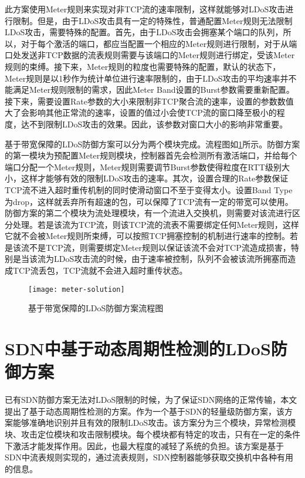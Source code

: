 此方案使用Meter规则来实现对非TCP流的速率限制，这样就能够对LDoS攻击进行限制。但是，由于LDoS攻击具有一定的特殊性，普通配置Meter规则无法限制LDoS攻击，需要特殊的配置。首先，由于LDoS攻击会拥塞某个端口的队列，所以，对于每个激活的端口，都应当配置一个相应的Meter规则进行限制，对于从端口处发送非TCP数据的流表规则需要与该端口的Meter规则进行绑定，受该Meter规则的束缚。接下来，Meter规则的粒度也需要特殊的配置，默认的状态下，Meter规则是以1秒作为统计单位进行速率限制的，由于LDoS攻击的平均速率并不能满足Meter规则限制的需求，因此Meter Band设置的Burst参数需要重新配置。接下来，需要设置Rate参数的大小来限制非TCP聚合流的速率，设置的参数数值大了会影响其他正常流的速率，设置的值过小会使TCP流的窗口降至极小的程度，达不到限制LDoS攻击的效果。因此，该参数对窗口大小的影响非常重要。


基于带宽保障的LDoS防御方案可以分为两个模块完成。流程图如\ref{fig:meter-solution}所示。防御方案的第一模块为预配置Meter规则模块，控制器首先会检测所有激活端口，并给每个端口分配一个Meter规则，Meter规则需要调节Burst参数使得粒度在RTT级别大小，这样才能够有效的限制LDoS攻击的速率。其次，设置合理的Rate参数保证TCP流不进入超时重传机制的同时使滑动窗口不至于变得太小。设置Band Type为drop，这样就丢弃所有超速的包，可以保障了TCP流有一定的带宽可以使用。防御方案的第二个模块为流处理模块，有一个流进入交换机，则需要对该流进行区分处理。若是该流为TCP流，则该TCP流的流表不需要绑定任何Meter规则，这样它就不会被Meter规则所束缚，可以按照TCP拥塞控制的机制进行速率的控制。若是该流不是TCP流，则需要绑定Meter规则以保证该流不会对TCP流造成损害，特别是当该流为LDoS攻击流的时候，由于速率被控制，队列不会被该流所拥塞而造成TCP流丢包，TCP流就不会进入超时重传状态。


\begin{figure}
    \centering
    \texttt{[image: meter-solution]}
    \caption{基于带宽保障的LDoS防御方案流程图}
    \label{fig:meter-solution}
\end{figure}


\section{SDN中基于动态周期性检测的LDoS防御方案}
\label{chap4:SoftGuard}
已有SDN防御方案无法对LDoS限制的时候，为了保证SDN网络的正常传输，本文提出了基于动态周期性检测的方案。作为一个基于SDN的轻量级防御方案，该方案能够准确地识别并且有效的限制LDoS攻击。该方案分为三个模块，异常检测模块、攻击定位模块和攻击限制模块。每个模块都有特定的攻击，只有在一定的条件下激活才能发挥作用。因此，也最大程度的减轻了系统的负担。该方案是基于SDN中流表规则实现的，通过流表规则，SDN控制器能够获取交换机中各种有用的信息。

